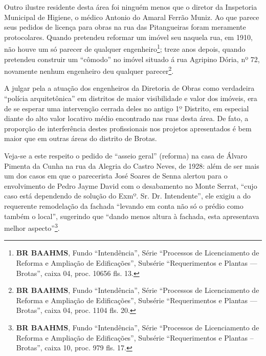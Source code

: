 Outro ilustre residente desta área foi ninguém menos que o diretor da Inspetoria Municipal de Higiene, o médico Antonio do Amaral Ferrão Muniz. Ao que parece seus pedidos de licença para obras na rua das Pitangueiras foram meramente protocolares. Quando pretendeu reformar um imóvel seu naquela rua, em 1910, não houve um só parecer de qualquer engenheiro\footnote{\textbf{BR BAAHMS}, Fundo ``Intendência'', Série ``Processos de Licenciamento de Reforma e Ampliação de Edificações'', Subsérie ``Requerimentos e Plantas --- Brotas'', caixa 04, proc. 10656 fls. 13.}; treze anos depois, quando pretendeu construir um ``cômodo'' no imóvel situado á rua Agripino Dória, nº 72, novamente nenhum engenheiro deu qualquer parecer\footnote{\textbf{BR BAAHMS}, Fundo ``Intendência'', Série ``Processos de Licenciamento de Reforma e Ampliação de Edificações'', Subsérie ``Requerimentos e Plantas --- Brotas'', caixa 04, proc. 1104 fls. 20.}.


A julgar pela a atuação dos engenheiros da Diretoria de Obras como verdadeira ``polícia arquitetônica'' em distritos de maior visibilidade e valor dos imóveis\cite{almeida_victoria_1997, almeida_vitrinescomercio_2014}, era de se esperar uma intervenção cerrada deles no antigo 1º Distrito, em especial diante do alto valor locativo médio encontrado nas ruas desta área. De fato, a proporção de interferência destes profissionais nos projetos apresentados é bem maior que em outras áreas do distrito de Brotas.

Veja-se a este respeito o pedido de ``asseio geral'' (reforma) na casa de Álvaro Pimenta da Cunha na rua da Alegria do Castro Neves, de 1928: além de ser mais um dos casos em que o parecerista José Soares de Senna alertou para o envolvimento de Pedro Jayme David com o desabamento no Monte Serrat, ``cujo caso está dependendo de solução do Exmº. Sr. Dr. Intendente'', ele exigiu a do requerente remodelação da fachada ``levando em conta não só o prédio como também o local'', sugerindo que ``dando menos altura à fachada, esta apresentava melhor aspecto''\footnote{\textbf{BR BAAHMS}, Fundo ``Intendência'', Série ``Processos de Licenciamento de Reforma e Ampliação de Edificações'', Subsérie ``Requerimentos e Plantas – Brotas'', caixa 10, proc. 979 fls. 17.}.

